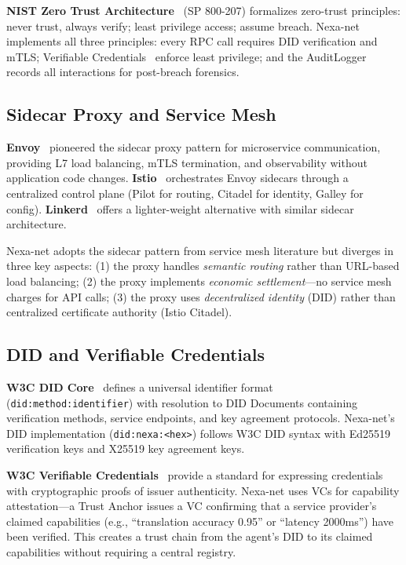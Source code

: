 \textbf{NIST Zero Trust Architecture}~\cite{nist2020zerotrust} (SP 800-207) formalizes zero-trust principles: never trust, always verify; least privilege access; assume breach. Nexa-net implements all three principles: every RPC call requires DID verification and mTLS; Verifiable Credentials~\cite{w3c_vc_2022} enforce least privilege; and the AuditLogger records all interactions for post-breach forensics.

\subsection{Sidecar Proxy and Service Mesh}

\textbf{Envoy}~\cite{envoy2017} pioneered the sidecar proxy pattern for microservice communication, providing L7 load balancing, mTLS termination, and observability without application code changes. \textbf{Istio}~\cite{istio2018} orchestrates Envoy sidecars through a centralized control plane (Pilot for routing, Citadel for identity, Galley for config). \textbf{Linkerd}~\cite{linkerd2018} offers a lighter-weight alternative with similar sidecar architecture.

Nexa-net adopts the sidecar pattern from service mesh literature but diverges in three key aspects: (1) the proxy handles \emph{semantic routing} rather than URL-based load balancing; (2) the proxy implements \emph{economic settlement}---no service mesh charges for API calls; (3) the proxy uses \emph{decentralized identity} (DID) rather than centralized certificate authority (Istio Citadel).

\subsection{DID and Verifiable Credentials}

\textbf{W3C DID Core}~\cite{w3c_did_2022} defines a universal identifier format (\texttt{did:method:identifier}) with resolution to DID Documents containing verification methods, service endpoints, and key agreement protocols. Nexa-net's DID implementation (\texttt{did:nexa:<hex>}) follows W3C DID syntax with Ed25519 verification keys and X25519 key agreement keys.

\textbf{W3C Verifiable Credentials}~\cite{w3c_vc_2022} provide a standard for expressing credentials with cryptographic proofs of issuer authenticity. Nexa-net uses VCs for capability attestation---a Trust Anchor issues a VC confirming that a service provider's claimed capabilities (e.g., ``translation accuracy 0.95'' or ``latency 2000ms'') have been verified. This creates a trust chain from the agent's DID to its claimed capabilities without requiring a central registry.